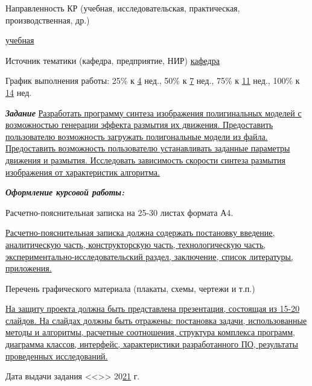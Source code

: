 Направленность КР (учебная, исследовательская, практическая, производственная, др.)

\uline{\hfill учебная \hfill}

Источник тематики (кафедра, предприятие, НИР) \uline{\hfill кафедра \hfill}

График выполнения работы:  25\% к \uline{4} нед., 50\% к \uline{7} нед., 75\% к \uline{11} нед., 100\% к \uline{14} нед.

\textbf{\textit{Задание}}
\uline{Разработать программу синтеза изображения полигинальных моделей с возможностью генерации эффекта размытия их движения.  Предоставить пользователю возможность загружать полигональные модели из файла. Предоставить возможность пользователю устанавливать заданные параметры движения и размытия. Исследовать зависимость скорости синтеза размытия изображения от характеристик алгоритма.
    \hfill}

\textbf{\textit{Оформление курсовой работы:}}

Расчетно-пояснительная записка на 25-30  листах формата А4.

\uline{Расчетно-пояснительная записка должна содержать постановку введение, аналитическую часть, конструкторскую часть, технологическую часть, экспериментально-исследовательский раздел, заключение, список литературы, приложения.
    \hfill}

Перечень графического материала (плакаты, схемы, чертежи и т.п.)

\uline{На защиту проекта должна быть представлена презентация, состоящая из 15-20 слайдов. На слайдах должны быть отражены: постановка задачи, использованные методы и алгоритмы, расчетные соотношения, структура комплекса программ, диаграмма классов, интерфейс, характеристики разработанного ПО, результаты проведенных исследований.
    \hfill}

Дата выдачи задания <<\uline{\hspace*{5mm}}>> \uline{\hspace*{2.5cm}} 20\uline{21} г.
\endgroup

\vfill

